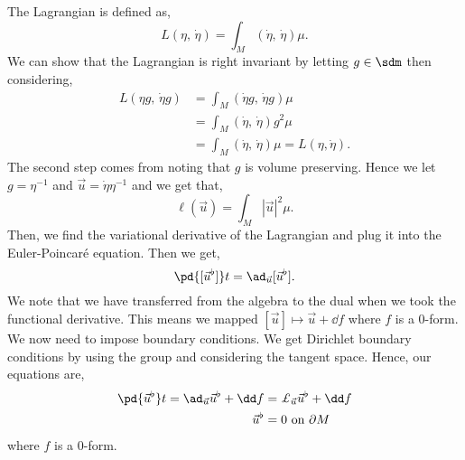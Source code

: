 \noindent
The Lagrangian is defined as,
$$ L(\eta,\, \dot \eta) = \int_M (\dot \eta,\, \dot \eta)\mu. $$
We can show that the Lagrangian is right invariant by letting $g \in \sdm$ then considering,
\begin{align*}
  L(\eta g,\, \dot \eta g) &= \int_M (\dot \eta g,\, \dot \eta g)\mu \\
  &= \int_M (\dot \eta,\, \dot \eta) g^2 \mu \\
  &= \int_M (\dot\eta,\, \dot\eta)\mu = L(\eta, \dot \eta).
\end{align*}
The second step comes from noting that $g$ is volume preserving. Hence we let $g = \eta^{-1}$ and $\vec u = \dot\eta \eta^{-1}$ and we get that,
$$ \ell(\vec u) = \int_M |\vec u|^2 \mu. $$
Then, we find the variational derivative of the Lagrangian and plug it into the Euler-Poincar\'e equation. Then we get,
$$ \pd {[\vec u^\flat]} t = \ad_{\vec u} [\vec u^\flat]. $$
We note that we have transferred from the algebra to the dual when we took the functional derivative. This means we mapped $[\vec u] \mapsto \vec u + \dd f$ where $f$ is a $0$-form. We now need to impose boundary conditions. We get Dirichlet boundary conditions by using the group and considering the tangent space. Hence, our equations are,
\begin{equation}
  \begin{split}
    \pd {\vec u^\flat} t = \ad_{\vec u} \vec u^\flat + \dd f &= \pounds_{\vec u} \vec u^\flat + \dd f \\
    \vec u^\flat &= 0 \text{ on }\partial M
  \end{split}
\end{equation}
where $f$ is a $0$-form.